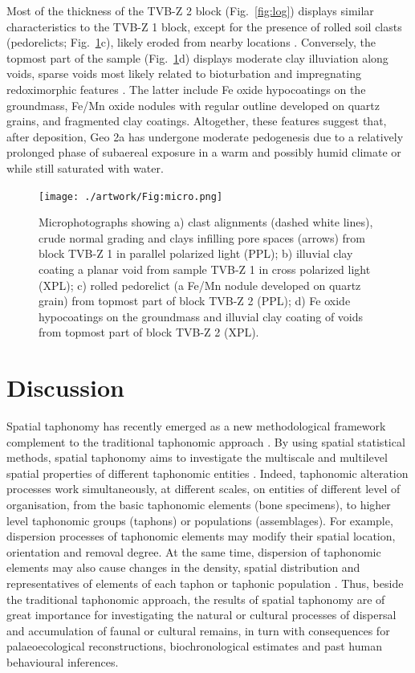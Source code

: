 \documentclass[review,times,authoryear]{elsarticle} %
\begin{document}
Most of the thickness of the TVB-Z 2 block (Fig.~\ref{fig:log}) displays similar characteristics to the TVB-Z 1 block, except for the presence of rolled soil clasts (pedorelicts; Fig.~\ref{fig:micro}c), likely eroded from nearby locations \citep{Cremaschi2018}. Conversely, the topmost part of the sample (Fig.~\ref{fig:micro}d) displays moderate clay illuviation along voids, sparse voids most likely related to bioturbation and impregnating redoximorphic features \citep{Lindbo2010}. The latter include Fe oxide hypocoatings on the groundmass, Fe/Mn oxide nodules with regular outline developed on quartz grains, and fragmented clay coatings. Altogether, these features suggest that, after deposition, Geo 2a has undergone moderate pedogenesis due to a relatively prolonged phase of subaereal exposure in a warm and possibly humid climate or while still saturated with water.

\begin{figure}
  \centering
  \texttt{[image: ./artwork/Fig:micro.png]}
  \caption{Microphotographs showing a) clast alignments (dashed white lines), crude normal grading and clays infilling pore spaces (arrows) from block TVB-Z 1 in parallel polarized light (PPL); b) illuvial clay coating a planar void from sample TVB-Z 1 in cross polarized light (XPL); c) rolled pedorelict (a Fe/Mn nodule developed on quartz grain) from topmost part of block TVB-Z 2 (PPL); d) Fe oxide hypocoatings on the groundmass and illuvial clay coating of voids from topmost part of block TVB-Z 2 (XPL).}
  \label{fig:micro}
\end{figure}

\section{Discussion}

Spatial taphonomy has recently emerged as a new methodological framework complement to the traditional taphonomic approach \citep{Dominguez-Rodrigo2017}. By using spatial statistical methods, spatial taphonomy aims to investigate the multiscale and multilevel spatial properties of different taphonomic entities \citep[\emph{sensu}][]{Fernandez-Lopez2006}. Indeed, taphonomic alteration processes work simultaneously, at different scales, on entities of different level of organisation, from the basic taphonomic elements (bone specimens), to higher level taphonomic groups (taphons) or populations (assemblages). For example, dispersion processes of taphonomic elements may modify their spatial location, orientation and removal degree. At the same time, dispersion of taphonomic elements may also cause changes in the density, spatial distribution and representatives of elements of each taphon or taphonic population \citep{Fernandez-Lopez2006}. Thus, beside the traditional taphonomic approach, the results of spatial taphonomy are of great importance for investigating the natural or cultural processes of dispersal and accumulation of faunal or cultural remains, in turn with consequences for palaeoecological reconstructions, biochronological estimates and past human behavioural inferences.
\end{document}
